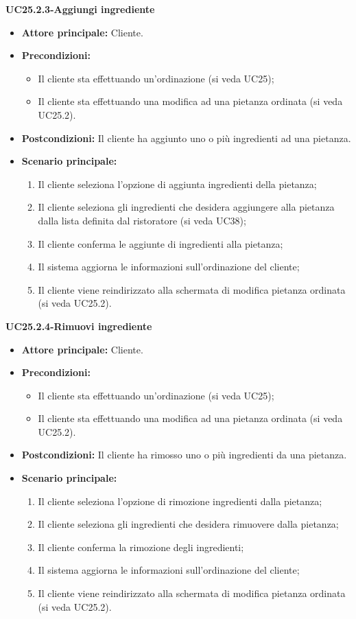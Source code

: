 \textbf{UC25.2.3-Aggiungi ingrediente}
\begin{itemize}
\item \textbf{Attore principale:} Cliente.
\item \textbf{Precondizioni:} 
\begin{itemize}
    \item Il cliente sta effettuando un'ordinazione (si veda UC25);
    \item Il cliente sta effettuando una modifica ad una pietanza ordinata (si veda UC25.2).
\end{itemize}
\item \textbf{Postcondizioni:} Il cliente ha aggiunto uno o più ingredienti ad una pietanza.
\item \textbf{Scenario principale:}
\begin{enumerate}
    \item Il cliente seleziona l'opzione di aggiunta ingredienti della pietanza;
    \item Il cliente seleziona gli ingredienti che desidera aggiungere alla pietanza dalla lista definita dal ristoratore (si veda UC38);
    \item Il cliente conferma le aggiunte di ingredienti alla pietanza;
    \item Il sistema aggiorna le informazioni sull'ordinazione del cliente;
    \item Il cliente viene reindirizzato alla schermata di modifica pietanza ordinata (si veda UC25.2).
\end{enumerate}
\end{itemize}

\textbf{UC25.2.4-Rimuovi ingrediente}
\begin{itemize}
\item \textbf{Attore principale:} Cliente.
\item \textbf{Precondizioni:} 
\begin{itemize}
    \item Il cliente sta effettuando un'ordinazione (si veda UC25);
    \item Il cliente sta effettuando una modifica ad una pietanza ordinata (si veda UC25.2).
\end{itemize}
\item \textbf{Postcondizioni:} Il cliente ha rimosso uno o più ingredienti da una pietanza.
\item \textbf{Scenario principale:}
\begin{enumerate}
    \item Il cliente seleziona l'opzione di rimozione ingredienti dalla pietanza;
    \item Il cliente seleziona gli ingredienti che desidera rimuovere dalla pietanza;
    \item Il cliente conferma la rimozione degli ingredienti;
    \item Il sistema aggiorna le informazioni sull'ordinazione del cliente;
    \item Il cliente viene reindirizzato alla schermata di modifica pietanza ordinata (si veda UC25.2).
\end{enumerate}
\end{itemize}

